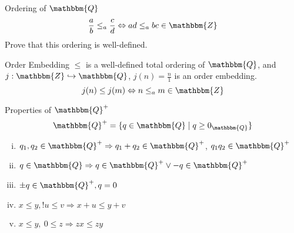 \documentclass[10pt]{extarticle}
\newcommand{\Q}{\mathbbm{Q}}
\newcommand{\Z}{\mathbbm{Z}}
\begin{document}
  \begin{problem}{Ordering of $\Q$}
    \[
      \frac{a}{b} \leq_a \frac{c}{d} \Leftrightarrow ad\leq_{a} bc \in \Z
    \] 
    Prove that this ordering is well-defined.

    \begin{problem}{Order Embedding}
      $\leq$ is a well-defined total ordering of $\Q$, and $j: \Z\hookrightarrow \Q$, $j(n) = \frac{n}{1}$ is an order embedding.
      \[
        j(n) \leq j(m) \Leftrightarrow n\leq_a m\in \Z
      \] 
    \end{problem}
    \begin{problem}{Properties of $\Q^+$}
      \[
        \Q^+ = \{q \in \Q \mid q \geq 0_{\Q}\}
      \] 
      \begin{enumerate}[(i)]
        \item $q_1,q_2\in \Q^+ \Rightarrow q_1 + q_2 \in \Q^+$, $q_1q_2 \in \Q^+$
        \item $q\in \Q \Rightarrow q\in \Q^+ \vee -q\in \Q^+$
        \item $\pm q\in \Q^+,q = 0$
        \item $x\leq y,!u\leq v \Rightarrow x+u \leq y+v$
        \item $x\leq y,~0\leq z \Rightarrow zx \leq zy$
      \end{enumerate}
    \end{problem}
  \end{problem}
\end{document}
